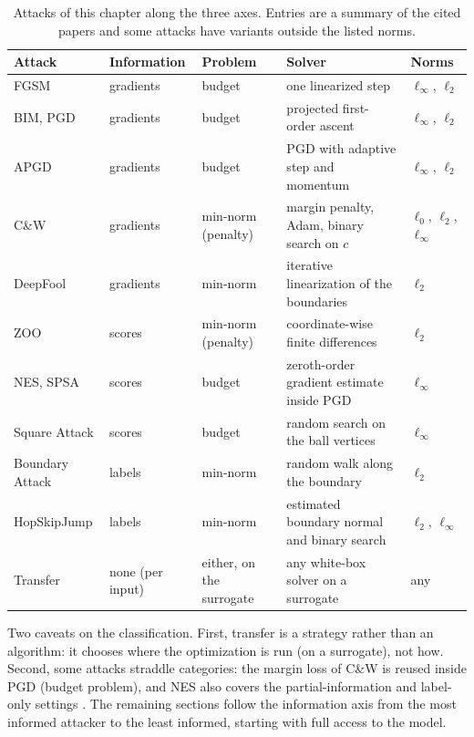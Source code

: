 \documentclass[10pt,a4paper]{extarticle}
\theoremstyle{definition}
\begin{document}
\begin{table}[h]
\centering
\small
\renewcommand{\arraystretch}{1.15}
\begin{tabularx}{\textwidth}{@{}l l l X l@{}}
\toprule
Attack & Information & Problem & Solver & Norms \\
\midrule
FGSM & gradients & budget & one linearized step & \(\ell_\infty\), \(\ell_2\) \\
BIM, PGD & gradients & budget & projected first-order ascent & \(\ell_\infty\), \(\ell_2\) \\
APGD & gradients & budget & PGD with adaptive step and momentum & \(\ell_\infty\), \(\ell_2\) \\
C\&W & gradients & min-norm (penalty) & margin penalty, Adam, binary search on \(c\) & \(\ell_0\), \(\ell_2\), \(\ell_\infty\) \\
DeepFool & gradients & min-norm & iterative linearization of the boundaries & \(\ell_2\) \\
ZOO & scores & min-norm (penalty) & coordinate-wise finite differences & \(\ell_2\) \\
NES, SPSA & scores & budget & zeroth-order gradient estimate inside PGD & \(\ell_\infty\) \\
Square Attack & scores & budget & random search on the ball vertices & \(\ell_\infty\) \\
Boundary Attack & labels & min-norm & random walk along the boundary & \(\ell_2\) \\
HopSkipJump & labels & min-norm & estimated boundary normal and binary search & \(\ell_2\), \(\ell_\infty\) \\
Transfer & none (per input) & either, on the surrogate & any white-box solver on a surrogate & any \\
\bottomrule
\end{tabularx}
\caption{Attacks of this chapter along the three axes. Entries are a summary of the cited papers and some attacks have variants outside the listed norms.}
\label{tab:taxonomy}
\end{table}

Two caveats on the classification. First, transfer is a strategy rather than an algorithm: it chooses where the optimization is run (on a surrogate), not how. Second, some attacks straddle categories: the margin loss of C\&W is reused inside PGD (budget problem), and NES also covers the partial-information and label-only settings \citep{ilyas2018blackbox}. The remaining sections follow the information axis from the most informed attacker to the least informed, starting with full access to the model.
\end{document}
